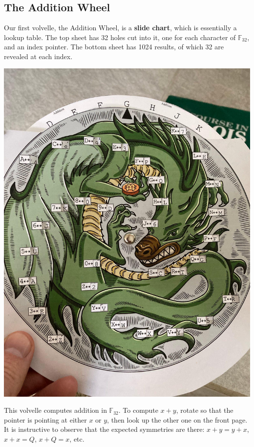 \documentclass[letterpaper]{article}
\newcommand{\fttwo}{\mathbb{F}_{32}}
\begin{document}
\subsection{The Addition Wheel}

Our first volvelle, the Addition Wheel, is a \textbf{slide chart}, which is
essentially a lookup table. The top sheet has 32 holes cut into it, one for
each character of $\fttwo$, and an index pointer. The bottom sheet has 1024
results, of which 32 are revealed at each index.

\begin{center}\includegraphics[scale=0.25]{images/addition-wheel.jpg}\end{center}

This volvelle computes addition in $\fttwo$. To compute $x+y$, rotate so that
the pointer is pointing at either $x$ or $y$, then look up the other one on
the front page. It is instructive to observe that the expected symmetries are
there: $x+y=y+x$, $x+x=Q$, $x+Q=x$, etc.
\end{document}
